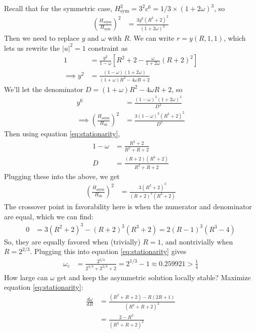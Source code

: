 \documentclass[11pt, reqno]{amsart}
\theoremstyle{notestyle}
\theoremstyle{defstyle}
\begin{document}
Recall that for the symmetric case, $H_\text{sym}^2 = 3^2c^6 = 1/3 \times (1+2\omega)^3$, so
\begin{align*}
    \left( \frac{H_\text{asym}}{H_\text{sym}} \right)^2
    &= \frac{3y^6(R^3+2)^2}{(1+2\omega)^3}
\end{align*}
Then we need to replace $y$ and $\omega$ with $R$.
We can write $r = y(R, 1, 1)$, which lets us rewrite the $|u|^2 = 1$ constraint as
\begin{align*}
    1 &= \frac{y^2}{1-\omega} \left[ R^2 + 2 - \frac{\omega}{1+2\omega} (R+2)^2 \right] \\
    \implies y^2
    &= \frac{(1-\omega)(1+2\omega)}{(1+\omega)R^2 - 4\omega R +2}
\end{align*}
We'll let the denominator $D = (1+\omega)R^2 - 4\omega R + 2$, so
\begin{align*}
    y^6
    &= \frac{(1-\omega)^3 (1+2\omega)^3}{D^3} \\
    \implies
    \left( \frac{H_\text{asym}}{H_\text{sh}} \right)^2
    &= \frac{3(1-\omega)^3 (R^3+2)^2}{D^3}
\end{align*}
Then using equation \ref{eq:stationarity},
\begin{align*}
    1-\omega
    &= \frac{R^2+2}{R^2+R+2} \\
    D
    &= \frac{(R+2)(R^3+2)}{R^2+R+2}
\end{align*}
Plugging these into the above, we get
\begin{align*}
    \left( \frac{H_\text{asym}}{H_\text{sh}} \right)^2
    &= \frac{3(R^2+2)^3}{(R+2)^3(R^3+2)}
\end{align*}
The crossover point in favorability here is when the numerator and denominator are equal, which we can find:
\begin{align*}
    0
    &= 3(R^2+2)^3 - (R+2)^3(R^3+2)
    = 2(R-1)^3 (R^3-4)
\end{align*}
So, they are equally favored when (trivially) $R=1$, and nontrivially when $R = 2^{2/3}$.
Plugging this into equation \ref{eq:stationarity} gives
\begin{align*}
    \omega_c
    &= \frac{2^{2/3}}{2^{4/3} + 2^{2/3} + 2}
    = 2^{1/3} - 1
    \approx 0.259921 > \frac{1}{4}
\end{align*}
How large can $\omega$ get and keep the asymmetric solution locally stable?
Maximize equation \ref{eq:stationarity}:
\begin{align*}
    \frac{d\omega}{dR}
    &= \frac{(R^2 + R + 2) - R(2R+1)}{(R^2+R+2)^2} \\
    &= \frac{2-R^2}{(R^2+R+2)^2}
\end{align*}
\end{document}
